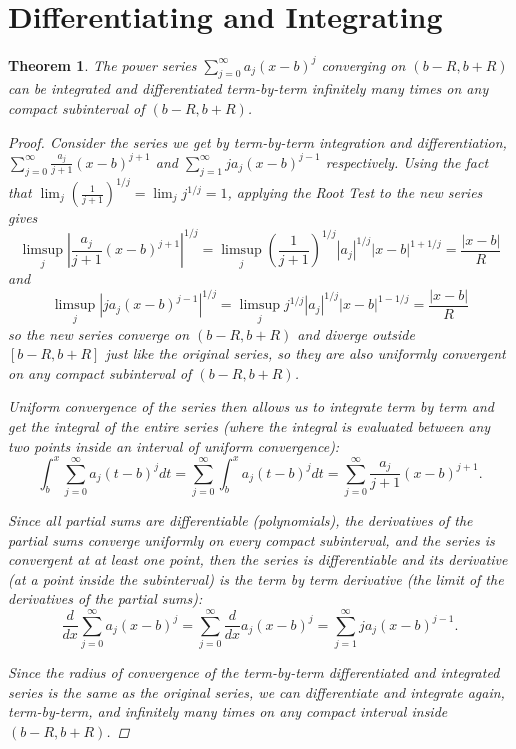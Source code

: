 \documentclass[12pt, letterpaper]{article}
\newtheorem{thm}{Theorem}[section]
\theoremstyle{definition}
\begin{document}
\section{Differentiating and Integrating}
\begin{thm}
  The power series $\sum_{j=0}^\infty a_j (x-b)^j$ converging on $(b-R, b+R)$ can be
  integrated and differentiated term-by-term infinitely many times on any compact
  subinterval of $(b-R, b+R)$.

  \begin{proof}
    Consider the series we get by term-by-term integration and differentiation,
    $\sum_{j=0}^\infty \frac{a_j}{j+1} (x-b)^{j+1}$ and $\sum_{j=1}^\infty j a_j (x-b)^{j-1}$
    respectively.
    Using the fact that $\lim_j \left(\frac{1}{j+1}\right)^{1/j} = \lim_j j^{1/j} =1$,
    applying the Root Test to the new series gives
    $$
      \limsup_j \left|\frac{a_j}{j+1} (x-b)^{j+1}\right|^{1/j}
      = \limsup_j \left(\frac{1}{j+1}\right)^{1/j} |a_j|^{1/j} |x-b|^{1+1/j}
      = \frac{|x-b|}{R}
    $$
    and
    $$
      \limsup_j \left|j a_j (x-b)^{j-1}\right|^{1/j}
      = \limsup_j j^{1/j} |a_j|^{1/j} |x-b|^{1-1/j}
      = \frac{|x-b|}{R}
    $$
    so the new series converge on $(b-R, b+R)$ and diverge outside $[b-R, b+R]$
    just like the original series,
    so they are also uniformly convergent on any compact subinterval of $(b-R, b+R)$.

    Uniform convergence of the series then allows us to integrate term by term and get the integral
    of the entire series (where the integral is evaluated between any two points inside an interval
    of uniform convergence):
    $$
    \int_b^x \sum_{j=0}^\infty a_j (t-b)^j dt = \sum_{j=0}^\infty \int_b^x a_j (t-b)^j dt
    = \sum_{j=0}^\infty \frac{a_j}{j+1} (x-b)^{j+1}.
    $$

    Since all partial sums are differentiable (polynomials),
    the derivatives of the partial sums converge uniformly on every compact subinterval,
    and the series is convergent at at least one point,
    then the series is differentiable and its derivative (at a point inside the subinterval)
    is the term by term derivative (the limit of the derivatives of the partial sums):
    $$
    \frac{d}{dx} \sum_{j=0}^\infty a_j (x-b)^j = \sum_{j=0}^\infty \frac{d}{dx} a_j (x-b)^j
    = \sum_{j=1}^\infty j a_j (x-b)^{j-1}.
    $$

    Since the radius of convergence of the term-by-term differentiated and integrated series
    is the same as the original series, we can differentiate and integrate again, term-by-term, and
    infinitely many times on any compact interval inside $(b-R, b+R)$.
  \end{proof}
\end{thm}
\end{document}
